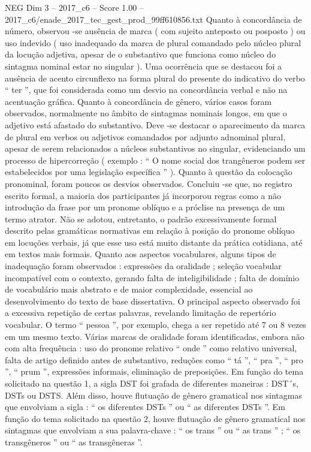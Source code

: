 \begin{textsample}{NEG Dim 3 – 2017\_c6 – Score 1.00 – 2017\_c6/enade\_2017\_tec\_gest\_prod\_99ff610856.txt}
Quanto à concordância de número, observou -se ausência de marca ( com sujeito anteposto ou posposto ) ou uso indevido ( uso inadequado da marca de plural comandado pelo núcleo plural da locução adjetiva, apesar de o substantivo que funciona como núcleo do sintagma nominal estar no singular ).
Uma ocorrência que se destacou foi a ausência de acento circunflexo na forma plural do presente do indicativo do verbo “ ter ”, que foi considerada como um desvio na concordância verbal e não na acentuação gráfica.
Quanto à concordância de gênero, vários casos foram observados, normalmente no âmbito de sintagmas nominais longos, em que o adjetivo está afastado do substantivo.
Deve -se destacar o aparecimento da marca de plural em verbos ou adjetivos comandados por adjunto adnominal plural, apesar de serem relacionados a núcleos substantivos no singular, evidenciando um processo de hipercorreção ( exemplo : “ O nome social dos trangêneros podem ser estabelecidos por uma legislação específica ” ).
Quanto à questão da colocação pronominal, foram poucos os desvios observados.
Concluiu -se que, no registro escrito formal, a maioria dos participantes já incorporou regras como a não introdução da frase por um pronome oblíquo e a próclise na presença de um termo atrator.
Não se adotou, entretanto, o padrão excessivamente formal descrito pelas gramáticas normativas em relação à posição do pronome oblíquo em locuções verbais, já que esse uso está muito distante da prática cotidiana, até em textos mais formais.
Quanto aos aspectos vocabulares, alguns tipos de inadequação foram observados : expressões da oralidade ; seleção vocabular incompatível com o contexto, gerando falta de inteligibilidade ; falta de domínio de vocabulário mais abstrato e de maior complexidade, essencial ao desenvolvimento do texto de base dissertativa.
O principal aspecto observado foi a excessiva repetição de certas palavras, revelando limitação de repertório vocabular.
O termo “ pessoa ”, por exemplo, chega a ser repetido até 7 ou 8 vezes em um mesmo texto.
Várias marcas de oralidade foram identificadas, embora não com alta frequência : uso do pronome relativo “ onde ” como relativo universal, falta de artigo definido antes de substantivo, reduções como “ tá ”, “ pra ”, “ pro ”, “ prum ”, expressões informais, eliminação de preposições.
Em função do tema solicitado na questão 1, a sigla DST foi grafada de diferentes maneiras : DST´s, DSTs ou DSTS.
Além disso, houve flutuação de gênero gramatical nos sintagmas que envolviam a sigla : “ os diferentes DSTs ” ou “ as diferentes DSTs ”.
Em função do tema solicitado na questão 2, houve flutuação de gênero gramatical nos sintagmas que envolviam a sua palavra-chave : “ os trans ” ou “ as trans ” ; “ os transgêneros ” ou “ as transgêneras ”.

\end{textsample}
